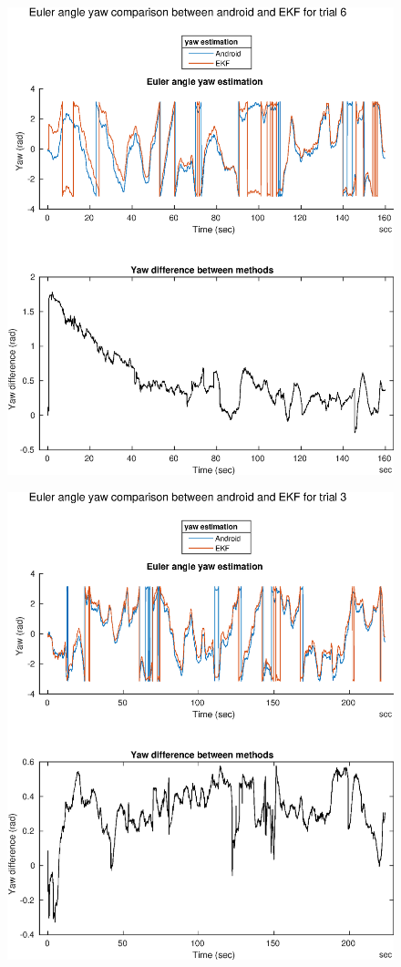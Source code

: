 \begin{figure}[H]
	\centering
	\includegraphics[width=0.7\linewidth]{images/20201118_1708_Yaw_difference_between_methods}
	\caption{}
	\label{fig:202011181708yawdifferencebetweenmethods}
\end{figure}
\begin{figure}[H]
	\centering
	\includegraphics[width=0.7\linewidth]{images/20201118_1705_Yaw_difference_between_methods}
	\caption{}
	\label{fig:202011181705yawdifferencebetweenmethods}
\end{figure}



